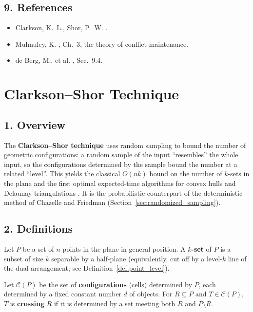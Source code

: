 \subsection{9. References}

\begin{itemize}
\item Clarkson, K.~L., Shor, P.~W. \cite{clarkson1989}.
\item Mulmuley, K. \cite{mulmuley1994}, Ch.~3, the theory of conflict
  maintenance.
\item de Berg, M., et al. \cite{deberg2008}, Sec.~9.4.
\end{itemize}

\section{Clarkson--Shor Technique}
\label{sec:randomized_clarkson_shor}

\subsection{1. Overview}

The \textbf{Clarkson--Shor technique} uses
random sampling to bound the number of geometric configurations: a random
sample of the input ``resembles'' the whole input, so the configurations
determined by the sample bound the number at a related ``level''. This yields
the classical $O(nk)$ bound on the number of $k$-sets in the plane and the
first optimal expected-time algorithms for convex hulls and Delaunay
triangulations \cite{clarkson1989}. It is the probabilistic counterpart of the
deterministic method of Chazelle and Friedman \cite{chazellefriedman1990}
(Section~\ref{sec:randomized_sampling}).

\subsection{2. Definitions}

\begin{definition}[$k$-Set]\label{def:rand_k_set}
  Let $P$ be a set of $n$ points in the plane in general position. A
  \textbf{$k$-set} of $P$ is a subset of size $k$ separable by a half-plane
  (equivalently, cut off by a level-$k$ line of the dual arrangement; see
  Definition~\ref{def:point_level}).
\end{definition}

\begin{definition}\label{def:rand_configuration_space}
  Let $\mathcal{C}(P)$ be the set of \textbf{configurations} (cells) determined
  by $P$, each determined by a fixed constant number $d$ of objects. For
  $R \subseteq P$ and $T \in \mathcal{C}(P)$, $T$ is \textbf{crossing} $R$ if
  it is determined by a set meeting both $R$ and $P \setminus R$.
\end{definition}

